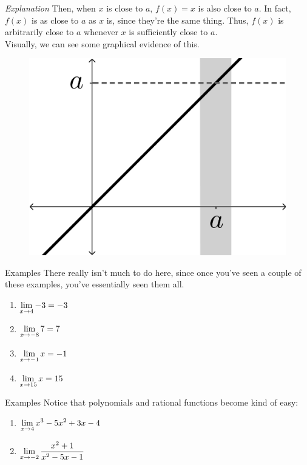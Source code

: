 \begin{enumerate}
\begin{describe}{\textit{Explanation}}
    Then, when $x$ is close to $a$, $f(x) = x$ is also close to $a$.
    In fact, $f(x)$ is as close to $a$ as $x$ is, since they're the same thing.
    Thus, $f(x)$ is arbitrarily close to $a$ whenever $x$ is sufficiently close to $a$.\\

    Visually, we can see some graphical evidence of this.
    \begin{figure}[h!tb]
      \includegraphics[scale=0.5]{./1_limits/images/1-2_graph2.png}
      \centering
    \end{figure}
  \end{describe}
\end{enumerate}

\begin{note}{Examples}
  There really isn't much to do here, since once you've seen a couple of these examples, you've essentially seen them all.

  \begin{enumerate}
    \item $\displaystyle \lim_{x\to 4} -3 = -3$
    \item $\displaystyle \lim_{x\to -8} 7 = 7$
    \item $\displaystyle \lim_{x\to -1} x = -1$
    \item $\displaystyle \lim_{x\to 15} x = 15$
  \end{enumerate}
\end{note}

\begin{note}{Examples}
  Notice that polynomials and rational functions become kind of easy:
  \begin{enumerate}
    \item $\displaystyle \lim_{x\to 4}x^3-5x^2+3x-4$
    \item $\displaystyle \lim_{x\to -2} \dfrac{x^2+1}{x^2-5x-1}$
  \end{enumerate}
\end{note}

